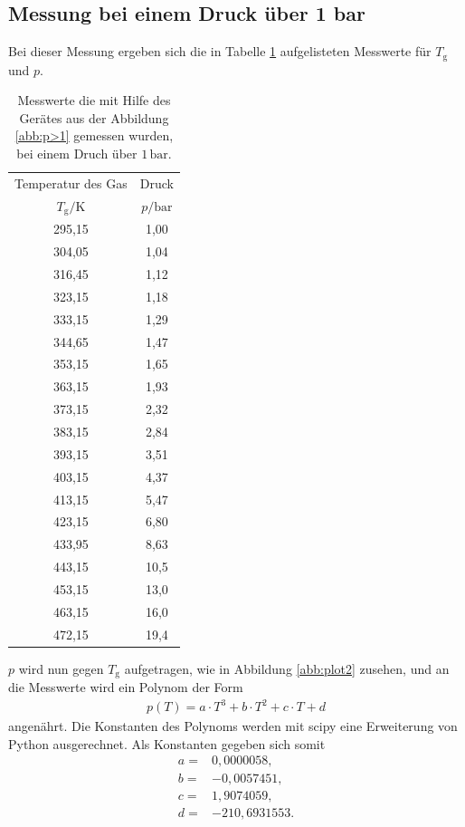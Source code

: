 \subsection{Messung bei einem Druck über 1 bar}
Bei dieser Messung ergeben sich die in Tabelle \ref{tab:p>1} aufgelisteten Messwerte für $T_\mathrm{g}$ und $p$.
\begin{table}   %
  \centering
  \caption{Messwerte die mit Hilfe des Gerätes aus der Abbildung \ref{abb:p>1} gemessen wurden, bei einem Druch über $1\,\si{\bar}$.}
  \label{tab:p>1}
  \begin{tabular}{c c}
    \toprule
    Temperatur des Gas &  Druck \\
    $T_\mathrm{g}/ \si{\kelvin}$ & $p/\si{\bar} $ \\
    \midrule
    295,15 & 1,00\\
    304,05 & 1,04\\
    316,45 & 1,12\\
    323,15 & 1,18\\
    333,15 & 1,29\\
    344,65 & 1,47\\
    353,15 & 1,65\\
    363,15 & 1,93\\
    373,15 & 2,32\\
    383,15 & 2,84\\
    393,15 & 3,51\\
    403,15 & 4,37\\
    413,15 & 5,47\\
    423,15 & 6,80\\
    433,95 & 8,63\\
    443,15 & 10,5\\
    453,15 & 13,0\\
    463,15 & 16,0\\
    472,15 & 19,4\\
    \bottomrule
  \end{tabular}
\end{table}
\FloatBarrier
$p$ wird nun gegen $T_\mathrm{g}$ aufgetragen, wie in Abbildung \ref{abb:plot2} zusehen, und an die Messwerte wird ein Polynom
der Form
\begin{align*}
p(T)=a\cdot T^3+b\cdot T^2 + c\cdot T + d
\end{align*}
angenährt.
Die Konstanten des Polynoms werden mit scipy eine Erweiterung von Python ausgerechnet. Als Konstanten gegeben sich somit
\begin{align*}
  a =&0,0000058,\\
  b =&-0,0057451,\\
  c =&1,9074059,\\
  d =&-210,6931553.
\end{align*}
